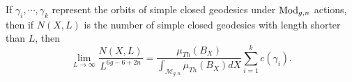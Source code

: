 \begin{theorem}
If $\gamma_i,\cdots,\gamma_k$ represent the orbits of simple closed geodesics under $\operatorname{Mod}_{g,n}$ actions, then if $N(X,L)$ is  the number of simple closed geodesics with length shorter than $L$, then 
$$
\lim_{L\to \infty}\frac{N(X,L)}{L^{6g-6+2n}}=\frac{\mu_{Th}(B_X)}{\int_{\mathscr{M}_{g,n}}\mu_{Th}(B_X)dX} \sum_{i=1}^k
c(\gamma_i).$$
\end{theorem}